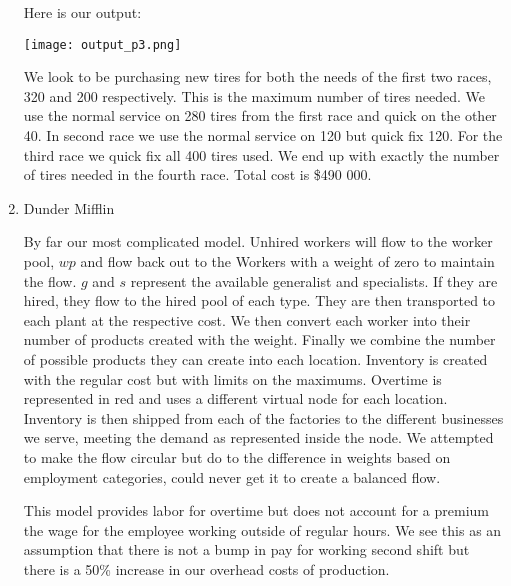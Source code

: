 \documentclass[11pt]{article}
\begin{document}
\begin{enumerate}
{\small {}}

Here is our output:

\texttt{[image: output\_p3.png]}

We look to be purchasing new tires for both the needs of the first two races, 320 and 200 respectively.  This is the maximum number of tires needed.  We use the normal service on 280 tires from the first race and quick on the other 40.  In second race we use the normal service on 120 but quick fix 120.  For the third race we quick fix all 400 tires used.  We end up with exactly the number of tires needed in the fourth race.  Total cost is \$490 000.

\item Dunder Mifflin

By far our most complicated model.  Unhired workers will flow to the worker pool, $wp$ and flow back out to the Workers with a weight of zero to maintain the flow.  $g$ and $s$ represent the available generalist and specialists.  If they are hired, they flow to the hired pool of each type.  They are then transported to each plant at the respective cost.  We then convert each worker into their number of products created with the weight.  Finally we combine the number of possible products they can create into each location.  Inventory is created with the regular cost but with limits on the maximums.  Overtime is represented in red and uses a different virtual node for each location.  Inventory is then shipped from each of the factories to the different businesses we serve, meeting the demand as represented inside the node.  We attempted to make the flow circular but do to the difference in weights based on employment categories, could never get it to create a balanced flow.

This model provides labor for overtime but does not account for a premium the wage for the employee working outside of regular hours.  We see this as an assumption that there is not a bump in pay for working second shift but there is a 50\% increase in our overhead costs of production.


\end{enumerate}
\end{document}

